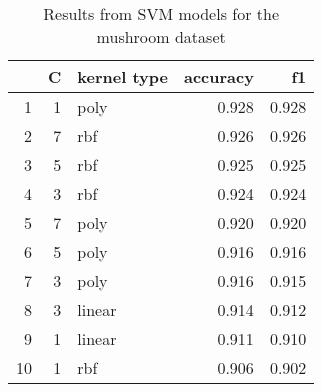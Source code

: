 \begin{table}
\centering
\caption{Results from SVM models for the mushroom dataset}
\begin{tabular}{rrlrr}
\toprule
 & C & kernel type & accuracy & f1 \\
\midrule
1 & 1 & poly & 0.928 & 0.928 \\
2 & 7 & rbf & 0.926 & 0.926 \\
3 & 5 & rbf & 0.925 & 0.925 \\
4 & 3 & rbf & 0.924 & 0.924 \\
5 & 7 & poly & 0.920 & 0.920 \\
6 & 5 & poly & 0.916 & 0.916 \\
7 & 3 & poly & 0.916 & 0.915 \\
8 & 3 & linear & 0.914 & 0.912 \\
9 & 1 & linear & 0.911 & 0.910 \\
10 & 1 & rbf & 0.906 & 0.902 \\
\bottomrule
\end{tabular}
\end{table}
